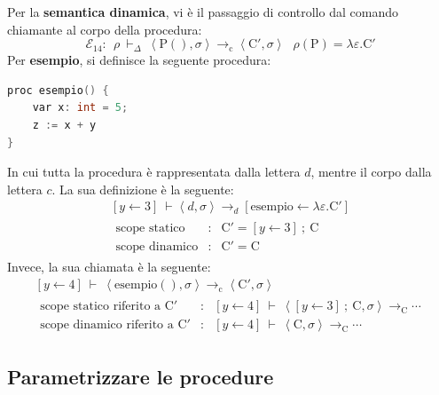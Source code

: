 \documentclass[a4paper]{article}
\begin{document}
	\noindent
	Per la \textbf{semantica dinamica}, vi è il passaggio di controllo dal comando chiamante al corpo della procedura:
	\begin{equation*}
		\mathcal{E}_{14} : \:\: \rho \: \vdash_{\Delta} \: \left\langle \mathrm{P()}, \sigma \right\rangle \longrightarrow_{\mathrm{c}} \left\langle \mathrm{C}', \sigma \right\rangle \:\:\: \rho\left(\mathrm{P}\right) = \lambda\varepsilon . \mathrm{C}'
	\end{equation*}
	Per \textcolor{Green4}{\textbf{esempio}}, si definisce la seguente procedura:
	\begin{lstlisting}[language=C]
proc esempio() {	
	var x: int = 5;	
	z := x + y		
}\end{lstlisting}
	In cui tutta la procedura è rappresentata dalla lettera $d$, mentre il corpo dalla lettera $c$. La sua definizione è la seguente:
	\begin{gather*}
		\left[y \leftarrow 3\right] \: \vdash \left\langle d, \sigma \right\rangle \longrightarrow_{d} \left[\text{esempio} \leftarrow \lambda\varepsilon . \mathrm{C}'\right] \\
		\begin{array}{lll}
			\text{scope statico} 	&:&	\mathrm{C}' = \left[y \leftarrow 3\right] \: ; \: \mathrm{C} \\
			\text{scope dinamico} 	&:& \mathrm{C}' = \mathrm{C}
		\end{array}
	\end{gather*}
	Invece, la sua chiamata è la seguente:
	\begin{gather*}
		\left[y \leftarrow 4\right] \: \vdash \: \left\langle \text{esempio}(), \sigma \right\rangle \longrightarrow_{\mathrm{c}} \left\langle \mathrm{C}', \sigma \right\rangle \\
		\begin{array}{lll}
			\text{scope statico riferito a } \mathrm{C}' 	&:&	\left[y \leftarrow 4\right] \: \vdash \: \left\langle \left[y \leftarrow 3\right] \: ; \: \mathrm{C}, \sigma \right\rangle \longrightarrow_{\mathrm{C}} \cdots \\
			\text{scope dinamico riferito a } \mathrm{C}' 	&:& \left[y \leftarrow 4\right] \: \vdash \: \left\langle \mathrm{C}, \sigma \right\rangle \longrightarrow_\mathrm{C} \cdots
		\end{array}
	\end{gather*}\newpage
	
	\subsection{Parametrizzare le procedure}
	
\end{document}
